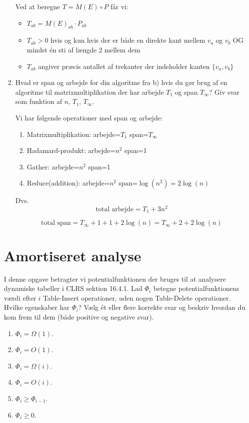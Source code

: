 \documentclass{article}
\theoremstyle{definition}
\begin{document}
\begin{enumerate}[label=\alph*)]
Ved at beregne $T = M(E) \circ P$ får vi:
\begin{itemize}
\item $T_{ab} = M(E)_{ab} \cdot P_{ab}$
\item $T_{ab} > 0$ hvis og kun hvis der er både en direkte kant mellem $v_a$ og $v_b$ OG mindst én sti af længde 2 mellem dem
\item $T_{ab}$ angiver præcis antallet af trekanter der indeholder kanten $\{v_a, v_b\}$
\end{itemize}

\item Hvad er span og arbejde for din algoritme fra b) hvis du gør brug af en algoritme til matrixmultiplikation der har arbejde $T_1$ og span $T_\infty$? Giv svar som funktion af $n$, $T_1$, $T_\infty$.

Vi har følgende operationer med span og arbejde:

\begin{enumerate}
    \item Matrixmultiplikation: arbejde=$T_1$ span=$T_\infty$
    \item Hadamard-produkt: arbejde=$n^2$ span=1
    \item Gather: arbejde=$n^2$ span=1
    \item Reduce(addition): arbejde=$n^2$ span=$\log(n^2)=2\log(n)$
\end{enumerate}

Dvs. 
\[
\text{total arbejde} = T_1 + 3n^2
\]

\[
\text{total span} = T_\infty + 1 + 1 + 2\log(n) = T_\infty + 2 + 2\log(n)
\]

\end{enumerate}

\section{Amortiseret analyse}

I denne opgave betragter vi potentialfunktionen der bruges til at analysere dynamiske tabeller i CLRS sektion 16.4.1. Lad $\Phi_i$ betegne potentialfunktionens værdi efter $i$ Table-Insert operationer, uden nogen Table-Delete operationer. Hvilke egenskaber har $\Phi_i$? Vælg ét eller flere korrekte svar og beskriv hvordan du kom frem til dem (både positive og negative svar).

\begin{enumerate}
\item $\Phi_i = \Omega(1)$.
\item $\Phi_i = O(1)$.
\item $\Phi_i = \Omega(i)$.
\item $\Phi_i = O(i)$.
\item $\Phi_i \geq \Phi_{i-1}$.
\item $\Phi_i \geq 0$.
\end{enumerate}
\end{document}
